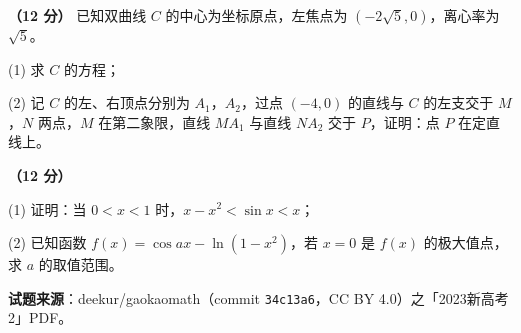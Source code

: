 \begin{question}
\textbf{（12 分）} 已知双曲线 $C$ 的中心为坐标原点，左焦点为 $\left(-2\sqrt5,0\right)$，离心率为 $\sqrt5$。

  (1) 求 $C$ 的方程；

  (2) 记 $C$ 的左、右顶点分别为 $A_1$，$A_2$，过点 $(-4,0)$ 的直线与 $C$ 的左支交于 $M$，$N$ 两点，$M$ 在第二象限，直线 $MA_1$ 与直线 $NA_2$ 交于 $P$，证明：点 $P$ 在定直线上。

\end{question}
\begin{question}
\textbf{（12 分）} 

  (1) 证明：当 $0<x<1$ 时，$x-x^{2}<\sin x<x$；

  (2) 已知函数 $f(x)=\cos ax-\ln\left(1-x^{2}\right)$，若 $x=0$ 是 $f(x)$ 的极大值点，求 $a$ 的取值范围。

\par\medskip

\begin{gktip}
\textbf{试题来源}：deekur/gaokaomath（commit \texttt{34c13a6}，CC BY 4.0）之「2023新高考2」PDF。
\end{gktip}

\end{question}